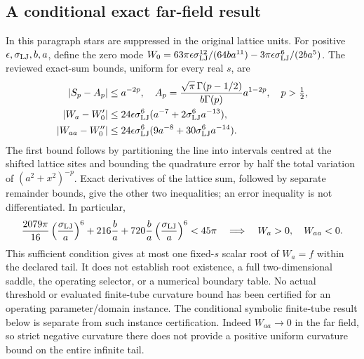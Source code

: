 \documentclass[11pt]{article}
\begin{document}
\subsection{A conditional exact far-field result}
In this paragraph stars are suppressed in the original lattice units.
For positive $\epsilon,\sigma_{\rm LJ},b,a$, define the zero mode
$W_0=63\pi\epsilon\sigma_{\rm LJ}^{12}/(64ba^{11})
-3\pi\epsilon\sigma_{\rm LJ}^{6}/(2ba^5)$.
The reviewed exact-sum bounds, uniform for every real $s$, are
\begin{align}
 |S_p-A_p|&\leq a^{-2p},\quad
 A_p=\frac{\sqrt\pi\,\Gamma(p-1/2)}{b\Gamma(p)}a^{1-2p},\quad p>\tfrac12,\\
 |W_a-W_0'|&\leq24\epsilon\sigma_{\rm LJ}^6
 (a^{-7}+2\sigma_{\rm LJ}^6a^{-13}),\\
 |W_{aa}-W_0''|&\leq24\epsilon\sigma_{\rm LJ}^6
 (9a^{-8}+30\sigma_{\rm LJ}^6a^{-14}).
\end{align}
The first bound follows by partitioning the line into intervals centred at
the shifted lattice sites and bounding the quadrature error by half the total
variation of $(a^2+x^2)^{-p}$. Exact derivatives of the lattice sum, followed
by separate remainder bounds, give the other two inequalities; an error
inequality is not differentiated. In particular,
\begin{equation}
 \frac{2079\pi}{16}\left(\frac{\sigma_{\rm LJ}}a\right)^6
 +216\frac ba+720\frac ba\left(\frac{\sigma_{\rm LJ}}a\right)^6<45\pi
 \quad\Longrightarrow\quad W_a>0,\quad W_{aa}<0.
\end{equation}
This sufficient condition gives at most one fixed-$s$ scalar root of $W_a=f$
within the declared tail. It does not establish root existence, a full
two-dimensional saddle, the operating selector, or a numerical boundary table.
No actual threshold or evaluated finite-tube curvature bound has been
certified for an operating parameter/domain instance. The conditional
symbolic finite-tube result below is separate from such instance certification.
Indeed $W_{aa}\to0$ in the far field, so strict negative curvature there
does not provide a positive uniform curvature bound on the entire infinite tail.
\end{document}
